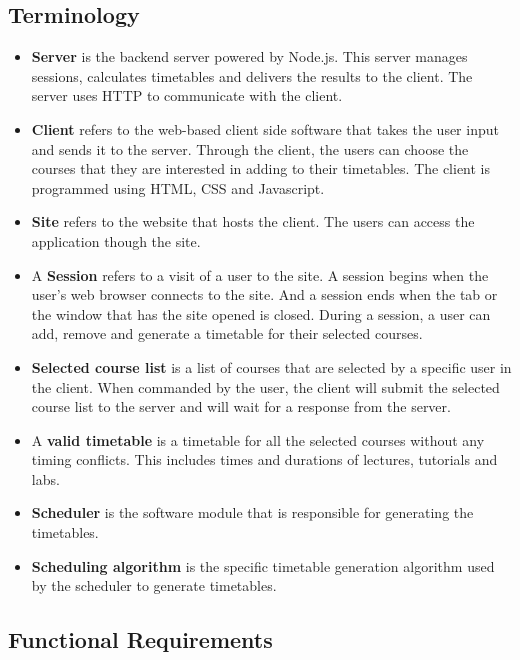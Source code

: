 \documentclass[12pt]{article}
\begin{document}
\subsection{Terminology}
\begin{itemize}
  \item \textbf{Server} is the backend server powered by Node.js. This server manages sessions, calculates timetables and delivers the results to the client. The server uses HTTP to communicate with the client.
  
  \item \textbf{Client} refers to the web-based client side software that takes the user input and sends it to the server. Through the client, the users can choose the courses that they are interested in adding to their timetables. The client is programmed using HTML, CSS and Javascript.
  
  \item \textbf{Site} refers to the website that hosts the client. The users can access the application though the site.
  
  \item A \textbf{Session} refers to a visit of a user to the site. A session begins when the user's web browser connects to the site. And a session ends when the tab or the window that has the site opened is closed. During a session, a user can add, remove and generate a timetable for their selected courses.
  
  \item \textbf{Selected course list} is a list of courses that are selected by a specific user in the client. When commanded by the user, the client will submit the selected course list to the server and will wait for a response from the server.
  
  \item A \textbf{valid timetable} is a timetable for all the selected courses without any timing conflicts. This includes times and durations of lectures, tutorials and labs.
  
  \item \textbf{Scheduler} is the software module that is responsible for generating the timetables.
  
  \item \textbf{Scheduling algorithm} is the specific timetable generation algorithm used by the scheduler to generate timetables.
\end{itemize}

\newpage
\subsection{Functional Requirements}
\end{document}
